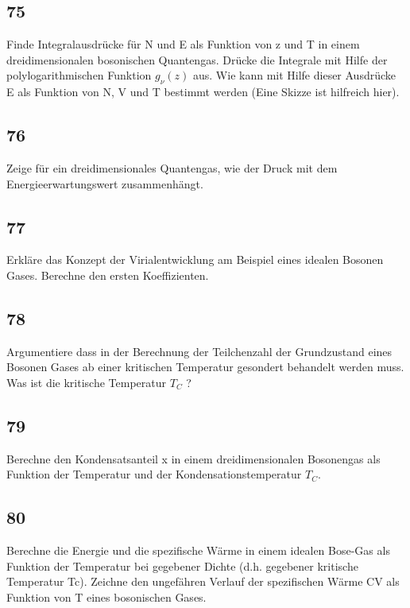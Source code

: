 \documentclass[12pt,a4paper]{report}
\newenvironment{myfrag}{\begin{it}}{\end{it}\vspace{3mm}\par}
\numberwithin{equation}{section}
\begin{document}
\subsection{75}
\begin{myfrag}
Finde Integralausdrücke für N und E als Funktion von z und T in einem
dreidimensionalen bosonischen Quantengas. Drücke die Integrale mit Hilfe
der polylogarithmischen Funktion $g_\nu (z)$  aus. Wie kann mit Hilfe dieser
Ausdrücke E als Funktion von N, V und T bestimmt werden (Eine Skizze ist
hilfreich hier).
\end{myfrag}
\subsection{76}
\begin{myfrag}
Zeige für ein dreidimensionales Quantengas, wie der Druck mit dem
Energieerwartungswert zusammenhängt.
\end{myfrag}
\subsection{77}
\begin{myfrag}
Erkläre das Konzept der Virialentwicklung am Beispiel eines idealen
Bosonen Gases. Berechne den ersten Koeffizienten.
\end{myfrag}
\subsection{78}
\begin{myfrag}
Argumentiere dass in der Berechnung der Teilchenzahl der Grundzustand
eines Bosonen Gases ab einer kritischen Temperatur gesondert behandelt
werden muss. Was ist die kritische Temperatur  $T_C$ ?
\end{myfrag}
\subsection{79}
\begin{myfrag}
Berechne den Kondensatsanteil x in einem dreidimensionalen Bosonengas als
Funktion der Temperatur und der Kondensationstemperatur $T_C$.
\end{myfrag}
\subsection{80}
\begin{myfrag}
Berechne die Energie und die spezifische Wärme in einem idealen Bose-Gas
als Funktion der Temperatur bei gegebener Dichte (d.h. gegebener kritische
Temperatur Tc). Zeichne den ungefähren Verlauf der spezifischen Wärme CV
als Funktion von T eines bosonischen Gases.
\end{myfrag}
\end{document}
